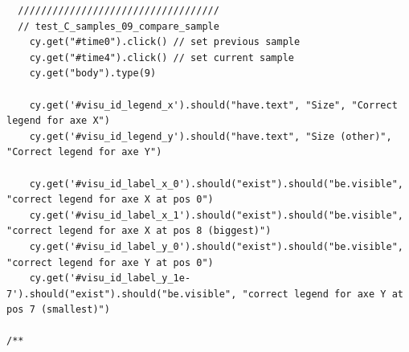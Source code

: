 \begin{verbatim}
  ///////////////////////////////////
  // test_C_samples_09_compare_sample
    cy.get("#time0").click() // set previous sample
    cy.get("#time4").click() // set current sample
    cy.get("body").type(9)

    cy.get('#visu_id_legend_x').should("have.text", "Size", "Correct legend for axe X")
    cy.get('#visu_id_legend_y').should("have.text", "Size (other)", "Correct legend for axe Y")

    cy.get('#visu_id_label_x_0').should("exist").should("be.visible", "correct legend for axe X at pos 0")
    cy.get('#visu_id_label_x_1').should("exist").should("be.visible", "correct legend for axe X at pos 8 (biggest)")
    cy.get('#visu_id_label_y_0').should("exist").should("be.visible", "correct legend for axe Y at pos 0")
    cy.get('#visu_id_label_y_1e-7').should("exist").should("be.visible", "correct legend for axe Y at pos 7 (smallest)")

/**
\end{verbatim}

